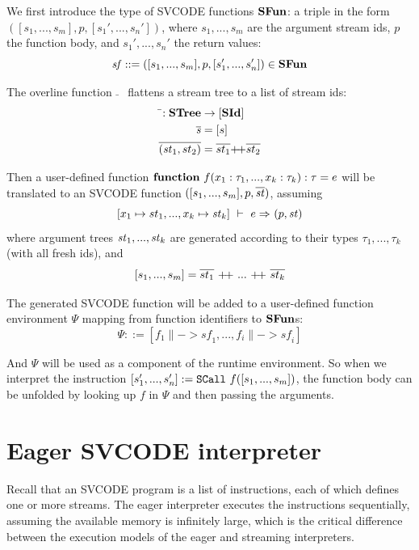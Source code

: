 \def\sf{\mathit{sf}}

We first introduce the type of SVCODE functions $\*{SFun}$: a triple in the form $([s_1,...,s_m], p, [s_1',...,s_n'])$, where $s_1,...,s_m$ are the argument stream ids, $p$ the function body, and $s_1',...,s_n'$ the return values:
$$ \sf ::= ([s_1,...,s_m], p, [s_1',...,s_n']) \in \*{SFun}$$

The overline function $\bar{}$ \ flattens a stream tree to a list of stream ids:
	\begin{align*}
\bar{}: \STree & \-> [\SId] \\
\overline{\s} & = [s] \\
\overline{(\st_1,st_2)} & = \overline{st_1} {\++} \overline{st_2}
\end{align*}

Then a user-defined function $\*{function} \  f(x_1: \tau_1, ..., x_k: \tau_k): \tau = e $ will be translated to an SVCODE function
$([s_1,...,s_m], p, \ol{\st})$, 
assuming
 $$\Trans{[x_1 \|-> st_1,..., x_k \|-> \st_k ]}{e}{}{}{\sfun{p}{\st}}$$ 
where argument trees $\st_1,...,\st_k$  are generated according to  their types $\tau_1,...,\tau_k$ (with all fresh ids), and
$$[s_1,...,s_m] = \ol{st_1} \ {\++} \ ... \ {\++} \ \ol{st_k}$$




The generated SVCODE function will be added to a user-defined function environment $\Psi$ mapping from function identifiers to $\*{SFun}$s:
$$ \Psi ::= [f_1 \|-> \sf_1,...,f_i \|-> \sf_i] $$

And $\Psi$ will be used as a component of the runtime environment. So when we interpret the instruction $\scall{f}{[s_1,...,s_m]}{[s_1',...,s_n']}$, the function body can be unfolded by looking up $f$ in $\Psi$ and then passing the arguments.

\section{Eager SVCODE interpreter}
Recall that an SVCODE program is a list of instructions, each of which defines one or more streams. 
The eager interpreter executes the instructions sequentially, assuming the available memory is infinitely large, which is the critical difference between the execution models of the eager and streaming interpreters.

